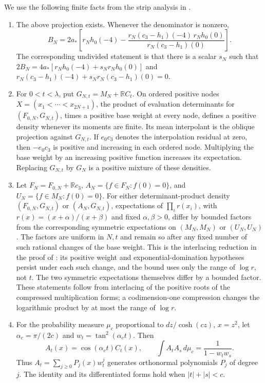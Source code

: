 We use the following finite facts from the strip analysis in
\cite[Theorem 2.1 and Lemmas 3.1--3.4]{UniformMarked}.
\begin{enumerate}
\item The above projection exists.  Whenever the denominator is nonzero,
\begin{equation}\label{c:strip-residual-formula}
 B_N=2a_*\left[
 r_Nh_0(-4)-
 \frac{r_N(c_3-h_1)(-4)\,r_Nh_0(0)}{r_N(c_3-h_1)(0)}
 \right].
\end{equation}
The corresponding undivided statement is that there is a scalar $s_N$ such that
$2B_N=4a_*[r_Nh_0(-4)+s_Nr_Nh_0(0)]$ and
$r_N(c_3-h_1)(-4)+s_Nr_N(c_3-h_1)(0)=0$.

\item For $0<t<\lambda$, put $G_{N,t}=M_N+\mathbb R C_t$.
On ordered positive nodes $X=(x_1<\cdots<x_{2N+1})$, the product of
evaluation determinants for $(F_{0,N},G_{N,t})$, times a positive
base weight at every node, defines a positive density whenever its
moments are finite.  Its mean interpolant is the oblique projection
against $G_{N,t}$.  If $e_0c_3$ denotes the interpolation residual at
zero, then $-e_0c_3$ is positive and increasing in each ordered node.
Multiplying the base weight by an increasing positive function increases
its expectation.  Replacing $G_{N,t}$ by $G_N$ is a positive mixture
of these densities.

\item Let $F_N=F_{0,N}+\mathbb R c_3$,
$A_N=\{f\in F_N:f(0)=0\}$, and
$U_N=\{f\in M_N:f(0)=0\}$.  For either determinant-product density
$(F_{0,N},G_{N,t})$ or $(A_N,G_{N,t})$, expectations of
$\prod_i r(x_i)$, with $r(x)=(x+\alpha)/(x+\beta)$ and fixed
$\alpha,\beta>0$, differ by bounded factors from the corresponding
symmetric expectations on $(M_N,M_N)$ or $(U_N,U_N)$.
The factors are uniform in $N,t$ and remain so after any fixed number
of such rational changes of the base weight. This is the interlacing
reduction in the proof of \cite[Lemma 3.2]{UniformMarked}: its positive
weight and exponential-domination hypotheses persist under each such
change, and the bound uses only the range of $\log r$, not $t$.  The two symmetric
expectations themselves differ by a bounded factor.  These statements
follow from interlacing of the positive roots of the compressed
multiplication forms; a codimension-one compression changes the
logarithmic product by at most the range of $\log r$.

\item For the probability measure $\mu_c$ proportional to
$dz/\cosh(cz)$, $x=z^2$, let
$\alpha_c=\pi/(2c)$ and $w_t=\tan^2(\alpha_ct)$.
Then
\begin{equation}\label{c:polynomial-generator}
 A_t(x)=\cos(\alpha_ct)C_t(x),\qquad
 \int A_tA_s\,d\mu_c=\frac1{1-w_tw_s}.
\end{equation}
Thus $A_t=\sum_{j\ge0}P_j(x)w_t^j$ generates orthonormal polynomials
$P_j$ of degree $j$.  The identity and its differentiated forms hold
when $|t|+|s|<c$.
\end{enumerate}

